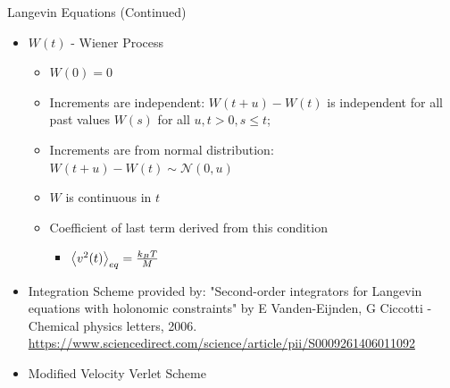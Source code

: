 \documentclass[10pt]{beamer}
\begin{document}
\begin{frame}[label={sec:org296bbd3}]{Langevin Equations (Continued)}
\begin{itemize}
\item \(W(t)\) - Wiener Process
\begin{itemize}
\item \(W(0) = 0\)
\item Increments are independent: \(W(t+u) - W(t)\) is independent for all past values \(W(s)\) for all \(u, t > 0, s \leq t\);
\item Increments are from normal distribution: \(W(t+u) - W(t) \sim \mathcal{N}(0, u)\)
\item \(W\) is continuous in \(t\)
\end{itemize}
\begin{itemize}
\item Coefficient of last term derived from this condition
\begin{itemize}
\item \(\expval{v^2(t)}_{eq} = \frac{k_BT}{M}\)
\end{itemize}
\end{itemize}

\item Integration Scheme provided by: "Second-order integrators for Langevin equations with holonomic constraints" by E Vanden-Eijnden, G Ciccotti - Chemical physics letters, 2006. \href{https://doi.org/10.1016/j.cplett.2006.07.086}{https://www.sciencedirect.com/science/article/pii/S0009261406011092}
\item Modified Velocity Verlet Scheme
\end{itemize}
\end{frame}
\end{document}
